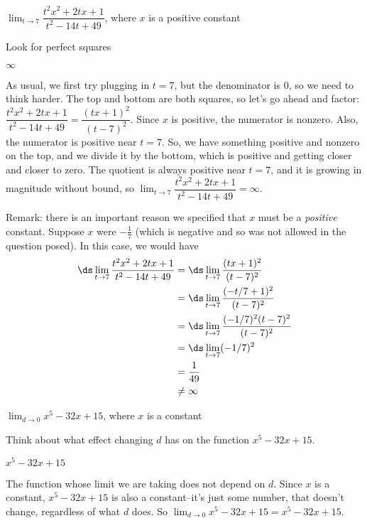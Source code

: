 \begin{Mquestion}
$\displaystyle\lim_{t \rightarrow 7} \dfrac{t^2x^2+2tx+1}{t^2-14t+49}$, where $x$ is a positive constant
\end{Mquestion}
\begin{hint} Look for perfect squares
\end{hint}
\begin{answer} $\infty$
\end{answer}
\begin{solution}
As usual, we first try plugging in $t=7$, but the denominator is 0, so we need to think harder. The top and bottom are both squares, so let's go ahead and factor:
$\dfrac{t^2x^2+2tx+1}{t^2-14t+49}=
\dfrac{(tx+1)^2}{(t-7)^2}$.
Since $x$ is positive, the numerator is nonzero. Also, the numerator is positive near $t=7$. So, we have something positive and nonzero on the top, and we divide it by the bottom, which is positive and getting closer and closer to zero. The quotient is always positive near $t=7$, and it is growing in magnitude without bound, so
$\displaystyle\lim_{t \rightarrow 7} \dfrac{t^2x^2+2tx+1}{t^2-14t+49}=\infty$.

Remark: there is an important reason we specified that $x$ must be a \emph{positive} constant. Suppose $x$ were $-\frac{1}{7}$ (which is negative
           and so was not allowed in the question posed). In this case, we would have
           \begin{align*}
             \ds\lim_{t\rightarrow 7} \frac{t^2x^2+2tx+1}{t^2-14t+49}
                &= \ds\lim_{t\rightarrow 7} \frac{(tx+1)^2}{(t-7)^2} \\
                &= \ds\lim_{t\rightarrow 7} \frac{(-t/7+1)^2}{(t-7)^2} \\
                &= \ds\lim_{t\rightarrow 7} \frac{(-1/7)^2(t-7)^2}{(t-7)^2} \\
                &= \ds\lim_{t\rightarrow 7} (-1/7)^2 \\
                &= \dfrac{1}{49}\\
                &\neq \infty
           \end{align*}
\end{solution}

\begin{Mquestion}
$\displaystyle\lim_{d \rightarrow 0} x^5-32x+15$, where $x$ is a constant
\end{Mquestion}
\begin{hint} Think about what effect changing $d$ has on the function $x^5-32x+15$.
\end{hint}
\begin{answer} $ x^5-32x+15$
\end{answer}
\begin{solution} The function whose limit we are taking does not depend on $d$. Since $x$ is a constant, $ x^5-32x+15$ is also a constant--it's just some number, that doesn't change, regardless of what $d$ does. So
$\displaystyle\lim_{d \rightarrow 0} x^5-32x+15=x^5-32x+15$.
\end{solution}


